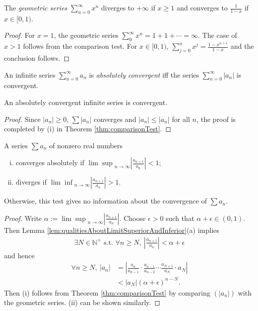 \begin{thm}
  \label{thm:geometricSeries}
  The \emph{geometric series} $\sum_{n=0}^{\infty} x^n$
  diverges to $+\infty$ if $x\ge 1$
  and converges to $\frac{1}{1-x}$ if $x\in [0,1)$.
\end{thm}
\begin{proof}
  For $x=1$, the geometric series
  $\sum_0^{\infty} x^n = 1 + 1+\cdots = \infty$.
  The case of $x>1$ follows from the comparison test.
  For $x\in[0,1)$,
  $\sum_{j=0}^{n} x^j = \frac{1-x^{n+1}}{1-x}$
  and the conclusion follows.
\end{proof}

\begin{defn}
  \label{def:absoluteConvergence}
  An infinite series $\sum_{n=0}^{\infty} a_n$
  is \emph{absolutely convergent}
  iff the series $\sum_{n=0}^{\infty} |a_n|$ is convergent.
\end{defn}

\begin{lem}
  \label{lem:absolutelyConvergenceSeriesConverge}
  An absolutely convergent infinite series is convergent.
\end{lem}
\begin{proof}
  Since $|a_{n}|\ge 0$,  $\sum |a_{n}|$ converges and
  $|a_{n}|\le |a_{n}|$ for all $n$, the proof is completed by
  (i) in Theorem \ref{thm:comparisonTest}.
\end{proof}

\begin{thm}
  \label{thm:ratioTest}
  A series $\sum a_n$ of nonzero real numbers 
  \begin{enumerate}[(i)]\itemsep0em
  \item converges absolutely if
    ${\lim\sup}_{n\rightarrow\infty}|\frac{a_{n+1}}{a_n}|<1$;
  \item diverges if ${\lim\inf}_{n\rightarrow\infty}|\frac{a_{n+1}}{a_n}|>1$. 
  \end{enumerate}
  Otherwise, this test gives no information
  about the convergence of $\sum a_n$.
\end{thm}
\begin{proof}
  Write $\alpha:={\lim\sup}_{n\rightarrow\infty}|\frac{a_{n+1}}{a_n}|$.
  Choose $\epsilon>0$ such that $\alpha+\epsilon\in(0,1)$.
  Then Lemma \ref{lem:qualitiesAboutLimitSuperiorAndInferior}(a) implies
  \begin{displaymath}
    \begin{array}{l}
    \exists N\in \mathbb{N}^{+} \text{ s.t. }
    \forall n\ge N,\ 
    \left|\frac{a_{n+1}}{a_{n}}\right|<\alpha+\epsilon
    \end{array}
  \end{displaymath}
  and hence
  \begin{align*}
    \forall n\ge N,\ 
    |a_{n}|&=\left|\frac{a_{n}}{a_{n-1}}\cdot \frac{a_{n-1}}{a_{n-2}}
     \cdots \frac{a_{N+1}}{a_{N}}\cdot a_{N}  \right|\\
    &<|a_{N}|(\alpha+\epsilon)^{n-N}.
  \end{align*}
  Then (i) follows from Theorem \ref{thm:comparisonTest}
  by comparing $(|a_n|)$ with the geometric series.
  (ii) can be shown similarly.
\end{proof}

